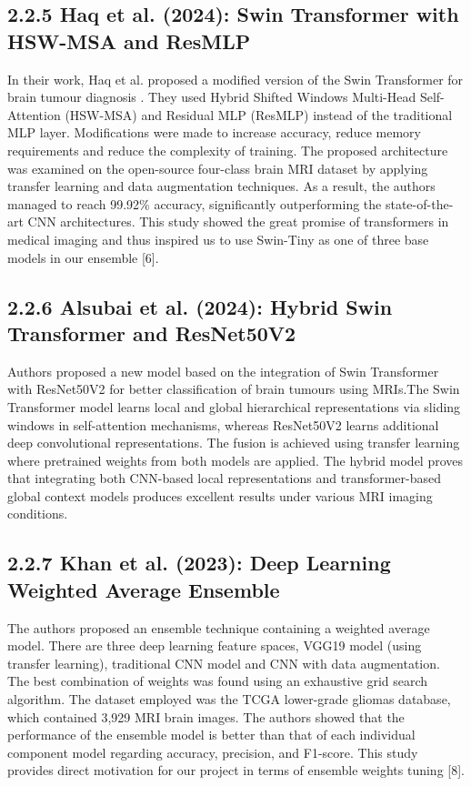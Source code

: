 \documentclass[12pt,a4paper,oneside]{report}
\begin{document}
\subsection{2.2.5 Haq et al. (2024): Swin Transformer with HSW-MSA and ResMLP}
In their work, Haq et al. proposed a modified version of the Swin Transformer for brain tumour diagnosis . They used Hybrid Shifted Windows Multi-Head Self-Attention (HSW-MSA) and Residual MLP (ResMLP) instead of the traditional MLP layer. Modifications were made to increase accuracy, reduce memory requirements and reduce the complexity of training. The proposed architecture was examined on the open-source four-class brain MRI dataset by applying transfer learning and data augmentation techniques. As a result, the authors managed to reach 99.92\% accuracy, significantly outperforming the state-of-the-art CNN architectures. This study showed the great promise of transformers in medical imaging and thus inspired us to use Swin-Tiny as one of three base models in our ensemble [6].
\subsection{2.2.6 Alsubai et al. (2024): Hybrid Swin Transformer and ResNet50V2}
Authors proposed a new model based on the integration of Swin Transformer with ResNet50V2 for better classification of brain tumours using MRIs.The Swin Transformer model learns local and global hierarchical representations via sliding windows in self-attention mechanisms, whereas ResNet50V2 learns additional deep convolutional representations. The fusion is achieved using transfer learning where pretrained weights from both models are applied. The hybrid model proves that integrating both CNN-based local representations and transformer-based global context models produces excellent results under various MRI imaging conditions.
\subsection{2.2.7 Khan et al. (2023): Deep Learning Weighted Average Ensemble}
The authors proposed an ensemble technique containing a weighted average model. There are three deep learning feature spaces, VGG19 model (using transfer learning), traditional CNN model and CNN with data augmentation. The best combination of weights was found using an exhaustive grid search algorithm. The dataset employed was the TCGA lower-grade gliomas database, which contained 3,929 MRI brain images. The authors showed that the performance of the ensemble model is better than that of each individual component model regarding accuracy, precision, and F1-score. This study provides direct motivation for our project in terms of ensemble weights tuning [8].
\end{document}
